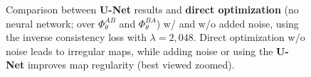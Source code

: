 \documentclass[10pt,twocolumn,letterpaper]{article} %
\begin{document}
\begin{figure}
   \caption{Comparison between \textbf{U-Net} results and \textbf{direct optimization} (no neural network; over $\Phi_\theta^{AB}$ and $\Phi_\theta^{BA}$) w/ and w/o added noise,  using the inverse consistency loss with $\lambda = 2,048$. Direct optimization w/o noise leads to irregular maps, while adding noise or using the \textbf{U-Net} improves map regularity (best viewed zoomed).} \label{fig:regularity_by_inexact_inverse_consistency}
     \vspace{-0.2cm}
\end{figure}
\end{document}
